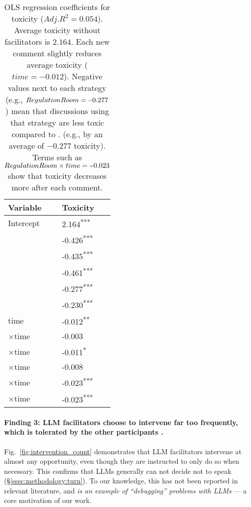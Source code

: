 \begin{table}[t]
	\centering
	\begin{tabular}{l p{2.5cm}}
		\toprule
		\textbf{Variable} & \textbf{Toxicity} \\
		\midrule
		Intercept & 2.164\textsuperscript{***} \\
		\strategynoinstr & -0.426\textsuperscript{***} \\
		\strategymodgame & -0.435\textsuperscript{***} \\
		\strategyrules & -0.461\textsuperscript{***} \\
		\strategyregroom & -0.277\textsuperscript{***} \\
		\strategyconstrcomm & -0.230\textsuperscript{***} \\
		time & -0.012\textsuperscript{**} \\
		\strategynoinstr$\times$time & -0.003 \\
		\strategymodgame$\times$time & -0.011\textsuperscript{*} \\
		\strategyrules$\times$time & -0.008 \\
		\strategyregroom$\times$time & -0.023\textsuperscript{***} \\
		\strategyconstrcomm$\times$time & -0.023\textsuperscript{***} \\
		\bottomrule
	\end{tabular}
	\small
	\asterisknote
	\normalsize
	\caption{\ac{OLS} regression coefficients for toxicity ($Adj. R^2=0.054$). Average toxicity without facilitators is $2.164$. Each new comment slightly reduces average toxicity ($time = \minus0.012$). Negative values next to each strategy (e.g., $\strategyregroom = \minus0.277$) mean that discussions using that strategy are less toxic  compared to \textit{\strategynomod}. (e.g., by an average of $\minus0.277$ toxicity). Terms such as $\strategyregroom \times time = \minus0.023$ show that toxicity decreases more after each comment.}
	\label{tab:toxicity}
\end{table}


\paragraph{Finding 3: \ac{LLM} facilitators choose to intervene far too frequently, which is tolerated by the other participants .} Fig.~\ref{fig:intervention_count} demonstrates that \ac{LLM} facilitators intervene at almost any opportunity, even though they are instructed to only do so when necessary. This confirms that \acp{LLM} generally can not decide not to speak (\S\ref{ssec:methodology:turn}). To our knowledge, this has not been reported in relevant literature, and \emph{is an example of ``debugging'' problems with \acp{LLM}} --- a core motivation of our work.

